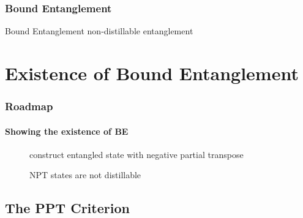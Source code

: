 \documentclass[compress,notes=hide]{beamer}
\begin{document}
\begin{frame}
\frametitle{Bound Entanglement}
\begin{block}{Bound Entanglement}
	non-distillable entanglement %
\end{block}
\vspace{10pt}
\begin{description}
\end{description}
\end{frame}


\section[Existence of BE]{Existence of Bound Entanglement}


\begin{frame}
\frametitle{Roadmap}
\framesubtitle{Showing the existence of BE}

\begin{description}
  \item[\cite{HorodeckiP1997}] construct entangled state with negative partial transpose
  \item[\cite{3Horodecki1998}] NPT states are not distillable
\end{description}

\end{frame}

\subsection{The PPT Criterion}
\end{document}
